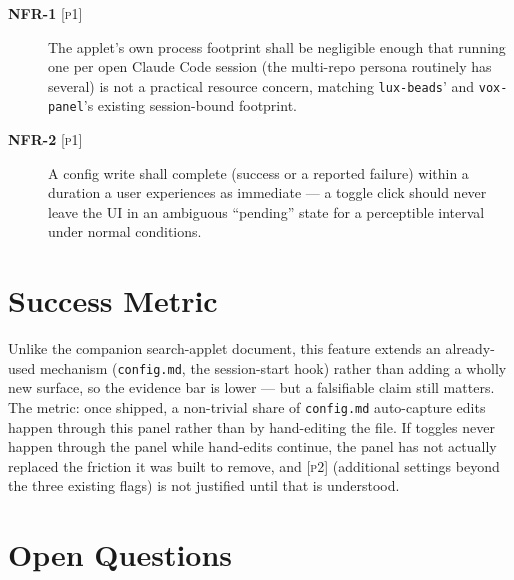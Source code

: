 \documentclass[a4paper,11pt]{report}
\newcommand{\nfr}[1]{\textbf{NFR-#1}}
\newcommand{\pone}{\textsc{[p1]}}
\newcommand{\ptwo}{\textsc{[p2]}}
\begin{document}
\begin{description}
  \item[\nfr{1} \pone{}] The applet's own process footprint shall be
    negligible enough that running one per open Claude Code session (the
    multi-repo persona routinely has several) is not a practical
    resource concern, matching \texttt{lux-beads}' and
    \texttt{vox-panel}'s existing session-bound footprint.
  \item[\nfr{2} \pone{}] A config write shall complete (success or a
    reported failure) within a duration a user experiences as immediate
    --- a toggle click should never leave the UI in an ambiguous
    ``pending'' state for a perceptible interval under normal
    conditions.
\end{description}

\section{Success Metric}

Unlike the companion search-applet document, this feature extends an
already-used mechanism (\texttt{config.md}, the session-start hook) rather
than adding a wholly new surface, so the evidence bar is lower --- but a
falsifiable claim still matters. The metric: once shipped, a non-trivial
share of \texttt{config.md} auto-capture edits happen through this panel
rather than by hand-editing the file. If toggles never happen through the
panel while hand-edits continue, the panel has not actually replaced the
friction it was built to remove, and \ptwo{} (additional settings beyond
the three existing flags) is not justified until that is understood.

\section{Open Questions}
\end{document}
